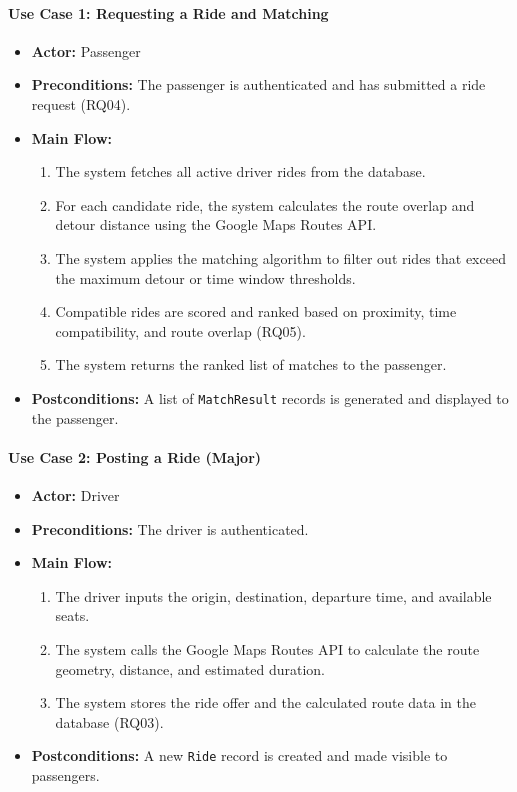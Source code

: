 \paragraph{Use Case 1: Requesting a Ride and Matching}
\begin{itemize}
	\item \textbf{Actor:} Passenger
	\item \textbf{Preconditions:} The passenger is authenticated and has submitted a ride request (RQ04).
  \item \textbf{Main Flow:}
  \begin{enumerate}
    \item The system fetches all active driver rides from the database.
    \item For each candidate ride, the system calculates the route overlap and detour distance using the Google Maps Routes API.
    \item The system applies the matching algorithm to filter out rides that exceed the maximum detour or time window thresholds.
    \item Compatible rides are scored and ranked based on proximity, time compatibility, and route overlap (RQ05).
    \item The system returns the ranked list of matches to the passenger.
  \end{enumerate}
  \item \textbf{Postconditions:} A list of \texttt{MatchResult} records is generated and displayed to the passenger.
\end{itemize}
 
\paragraph{Use Case 2: Posting a Ride (Major)}
\begin{itemize}
  \item \textbf{Actor:} Driver
  \item \textbf{Preconditions:} The driver is authenticated.
  \item \textbf{Main Flow:}
  \begin{enumerate}
    \item The driver inputs the origin, destination, departure time, and available seats.
    \item The system calls the Google Maps Routes API to calculate the route geometry, distance, and estimated duration.
    \item The system stores the ride offer and the calculated route data in the database (RQ03).
  \end{enumerate}
  \item \textbf{Postconditions:} A new \texttt{Ride} record is created and made visible to passengers.
\end{itemize}
 
